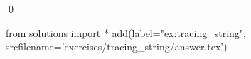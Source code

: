 
\begin{ex} 
  \label{ex:tracing_string}
  
  \qed
\end{ex} 
\begin{python0}
from solutions import *
add(label="ex:tracing_string",
    srcfilename='exercises/tracing_string/answer.tex') 
\end{python0}
